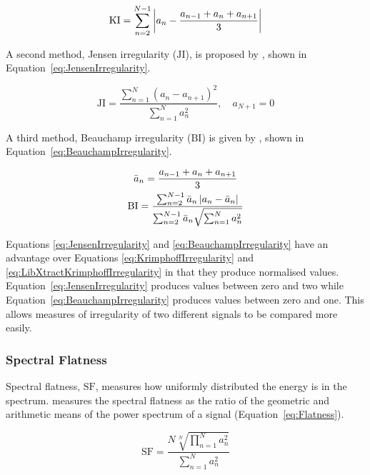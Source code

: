 			\begin{equation}
				\mathrm{KI} = \sum_{n = 2}^{N - 1}
						  \left|a_{n} - \frac{a_{n-1} + a_{n} + a_{n+1}}{3}\right|
				\label{eq:LibXtractKrimphoffIrregularity}
			\end{equation}

			A second method, Jensen irregularity ($\mathrm{JI}$), is proposed by \citet{jensen1999timbre},
			shown in Equation~\ref{eq:JensenIrregularity}.

			\begin{equation}
				\mathrm{JI} = \frac{\sum_{n = 1}^{N} (a_{n} - a_{n+1})^{2}}
						   {\sum_{n = 1}^{N} a_{n}^{2}},
					      \quad a_{N+1} = 0
				\label{eq:JensenIrregularity}
			\end{equation}

			A third method, Beauchamp irregularity ($\mathrm{BI}$) is given by \citet{beauchamp2007analysis},
			shown in Equation~\ref{eq:BeauchampIrregularity}.

			\begin{gather}
			        \bar{a}_{n} = \frac{a_{n-1} + a_{n} + a_{n+1}}{3} \nonumber \\
				\mathrm{BI} = \frac{\sum_{n = 2}^{N - 1} \bar{a}_{n} \left|a_{n} - \bar{a}_{n}\right|}
						   {\sum_{n = 2}^{N - 1} \bar{a}_{n} \sqrt{\sum_{n = 1}^{N} a_{n}^{2}}}
				\label{eq:BeauchampIrregularity}
			\end{gather}

			Equations \ref{eq:JensenIrregularity} and \ref{eq:BeauchampIrregularity} have an advantage over
			Equations \ref{eq:KrimphoffIrregularity} and \ref{eq:LibXtractKrimphoffIrregularity} in that they
			produce normalised values. Equation~\ref{eq:JensenIrregularity} produces values between zero and
			two while Equation~\ref{eq:BeauchampIrregularity} produces values between zero and one. This allows
			measures of irregularity of two different signals to be compared more easily.

		\subsubsection*{Spectral Flatness}
			Spectral flatness, $\mathrm{SF}$, measures how uniformly distributed the energy is in the spectrum.
			\citet{johnston1988transform} measures the spectral flatness as the ratio of the geometric and
			arithmetic means of the power spectrum of a signal (Equation~\ref{eq:Flatness}).

			\begin{equation}
				\mathrm{SF} = \frac{N\sqrt[N]{\prod_{n = 1}^{N} a_{n}^{2}}}
						   {\sum_{n = 1}^{N} a_{n}^{2}}
				\label{eq:Flatness}
			\end{equation}

